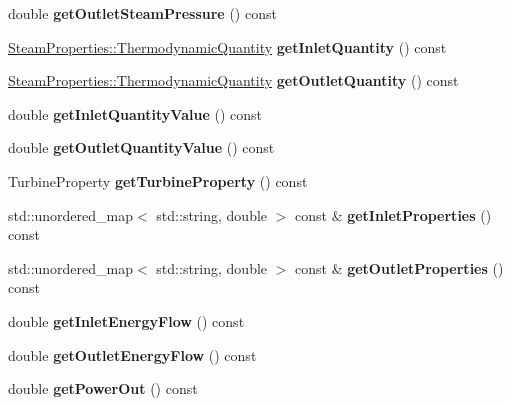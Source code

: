 \begin{DoxyCompactItemize}
double {\bfseries get\+Outlet\+Steam\+Pressure} () const
\item 
\mbox{\label{class_turbine_ac9e91d9539cea5cd1e0037c397c28c78}} 
\hyperlink{class_steam_properties_ae0294bedf7d178c2d8fb6aed0f62fbff}{Steam\+Properties\+::\+Thermodynamic\+Quantity} {\bfseries get\+Inlet\+Quantity} () const
\item 
\mbox{\label{class_turbine_acd3e98ab67754b652de97498d9bec6d2}} 
\hyperlink{class_steam_properties_ae0294bedf7d178c2d8fb6aed0f62fbff}{Steam\+Properties\+::\+Thermodynamic\+Quantity} {\bfseries get\+Outlet\+Quantity} () const
\item 
\mbox{\label{class_turbine_a3d8a3f317fa71abb3404144371615725}} 
double {\bfseries get\+Inlet\+Quantity\+Value} () const
\item 
\mbox{\label{class_turbine_aca98f128213e02e95dfd6f4b2ad8de4e}} 
double {\bfseries get\+Outlet\+Quantity\+Value} () const
\item 
\mbox{\label{class_turbine_a14f6eff49b501aa8c5a22d404dbeaac0}} 
Turbine\+Property {\bfseries get\+Turbine\+Property} () const
\item 
\mbox{\label{class_turbine_a575f5527de69f57d4f344f3c66ee898d}} 
std\+::unordered\+\_\+map$<$ std\+::string, double $>$ const  \& {\bfseries get\+Inlet\+Properties} () const
\item 
\mbox{\label{class_turbine_ae6ac54bac33feff9d06800acdefacf9d}} 
std\+::unordered\+\_\+map$<$ std\+::string, double $>$ const  \& {\bfseries get\+Outlet\+Properties} () const
\item 
\mbox{\label{class_turbine_ae5d55a7b882e4780d490d43409f8f06c}} 
double {\bfseries get\+Inlet\+Energy\+Flow} () const
\item 
\mbox{\label{class_turbine_aa20c0f9dd81cd9bfd5eda77f588516b5}} 
double {\bfseries get\+Outlet\+Energy\+Flow} () const
\item 
\mbox{\label{class_turbine_a89585cc2fbfdbe67d539eae08c369fa2}} 
double {\bfseries get\+Power\+Out} () const

\end{DoxyCompactItemize}
